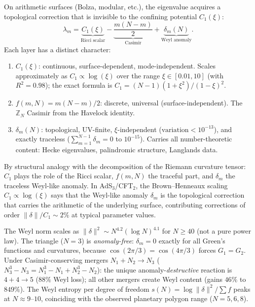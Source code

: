 On arithmetic surfaces (Bolza, modular, etc.), the eigenvalue
acquires a topological correction that is invisible to the
confining potential $C_1(\xi)$:
\begin{equation}\label{eq:three-layer}
  \lambda_m = \underbrace{C_1(\xi)}_{\text{Ricci scalar}}
    - \underbrace{\frac{m(N{-}m)}{2}}_{\text{Casimir}}
    + \underbrace{\delta_m(N)}_{\text{Weyl anomaly}}.
\end{equation}
Each layer has a distinct character:
\begin{enumerate}
\item $C_1(\xi)$: continuous, surface-dependent, mode-independent.
  Scales approximately as $C_1 \propto \log(\xi)$ over the range
  $\xi \in [0.01, 10]$ (with $R^2 = 0.98$); the exact formula is
  $C_1 = (N{-}1)(1{+}\xi^2)/(1{-}\xi)^2$.
\item $f(m,N) = m(N{-}m)/2$: discrete, universal (surface-independent).
  The $\mathbb{Z}_N$ Casimir from the Havelock identity.
\item $\delta_m(N)$: topological, UV-finite, $\xi$-independent
  ($\text{variation} < 10^{-13}$), and exactly traceless
  ($\sum_{m=1}^{N-1} \delta_m = 0$ to $10^{-15}$).
  Carries all number-theoretic content: Hecke eigenvalues,
  palindromic structure, Langlands data.
\end{enumerate}
By structural analogy with the decomposition of the Riemann
curvature tensor: $C_1$ plays the role of the Ricci scalar,
$f(m,N)$ the traceful part, and $\delta_m$ the traceless Weyl-like
anomaly.
In AdS$_3$/CFT$_2$, the Brown--Henneaux scaling
$C_1 \propto \log(\xi)$ says that
the Weyl-like anomaly $\delta_m$ is the topological correction
that carries the arithmetic of the underlying surface, contributing
corrections of order $\|\delta\|/C_1 \sim 2\%$ at typical parameter values.

The Weyl norm scales as
$\|\delta\|^2 \sim N^{4.2}(\log N)^{4.1}$ for $N \ge 40$
(not a pure power law).
The triangle ($N = 3$) is \emph{anomaly-free}:
$\delta_m = 0$ exactly for all Green's functions and curvatures,
because $\cos(2\pi/3) = \cos(4\pi/3)$ forces $G_1 = G_2$.
Under Casimir-conserving mergers $N_1 + N_2 \to N_3$
($N_3^3 {-} N_3 = N_1^3 {-} N_1 + N_2^3 {-} N_2$):
the unique anomaly-\emph{destructive} reaction is
$4{+}4 \to 5$ ($88\%$ Weyl loss); all other mergers create
Weyl content (gains $46\%$ to $849\%$).
The Weyl entropy per degree of freedom $s(N) = \log\|\delta\|^2/\sum f$
peaks at $N \approx 9$--$10$, coinciding with the observed
planetary polygon range ($N = 5, 6, 8$).

